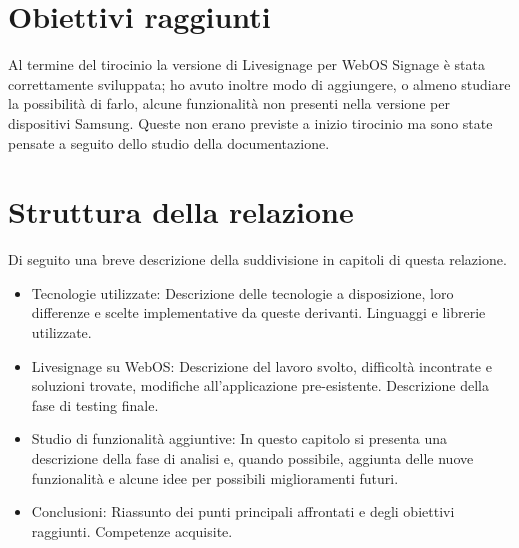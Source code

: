 \section{Obiettivi raggiunti}

Al termine del tirocinio la versione di Livesignage per WebOS Signage è stata correttamente sviluppata; ho avuto inoltre modo di aggiungere, o almeno studiare la possibilità di farlo, alcune funzionalità non presenti nella versione per dispositivi Samsung. Queste non erano previste a inizio tirocinio ma sono state pensate a seguito dello studio della documentazione.

\section{Struttura della relazione}
Di seguito una breve descrizione della suddivisione in capitoli di questa relazione.
\begin{itemize}
    \item Tecnologie utilizzate: Descrizione delle tecnologie a disposizione, loro differenze e scelte implementative da queste derivanti. Linguaggi e librerie utilizzate.
    \item Livesignage su WebOS: Descrizione del lavoro svolto, difficoltà incontrate e soluzioni trovate, modifiche all'applicazione pre-esistente. Descrizione della fase di testing finale.
    \item Studio di funzionalità aggiuntive: In questo capitolo si presenta una descrizione della fase di analisi e, quando possibile, aggiunta delle nuove funzionalità e alcune idee per possibili miglioramenti futuri.
    \item Conclusioni: Riassunto dei punti principali affrontati e degli obiettivi raggiunti. Competenze acquisite.
\end{itemize}